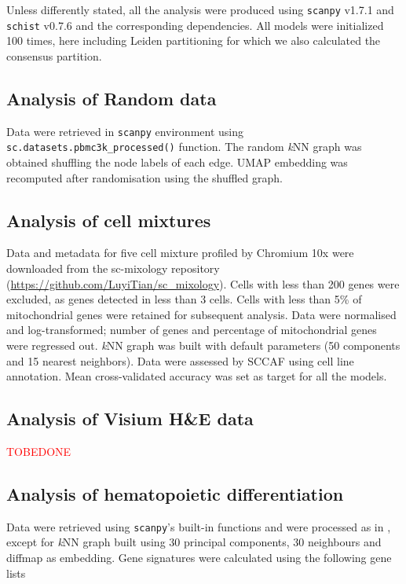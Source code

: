 \documentclass[10pt]{article}
\begin{document}
Unless differently stated, all the analysis were produced using \texttt{scanpy} v1.7.1 \cite{wolf_2018} and \texttt{schist} v0.7.6 and the corresponding dependencies. All models were initialized 100 times, here including Leiden partitioning for which we also calculated the consensus partition.

\subsection*{Analysis of Random data}

Data were retrieved in \texttt{scanpy} environment using \texttt{sc.datasets.pbmc3k\_processed()} function. The random \emph{k}NN graph was obtained shuffling the node labels of each edge. UMAP embedding was recomputed after randomisation using the shuffled graph.

\subsection*{Analysis of cell mixtures}

Data and metadata for five cell mixture profiled by Chromium 10x were downloaded from the sc-mixology repository (\href{https://github.com/LuyiTian/sc_mixology}{https:/\slash github.com\slash LuyiTian\slash sc\_mixology}). Cells with less than 200 genes were excluded, as genes detected in less than 3 cells. Cells with less than 5\% of mitochondrial genes were retained for subsequent analysis. Data were normalised and log-transformed; number of genes and percentage of mitochondrial genes were regressed out. \emph{k}NN graph was built with default parameters (50 components and 15 nearest neighbors). Data were assessed by SCCAF using cell line annotation. Mean cross-validated accuracy was set as target for all the models.

\subsection*{Analysis of Visium H\&E data}
\textcolor{red}{TOBEDONE}

\subsection*{Analysis of hematopoietic differentiation}

Data were retrieved using \texttt{scanpy}'s built-in functions and were processed as in \cite{wolf_2019}, except for \emph{k}NN graph built using 30 principal components, 30 neighbours and diffmap as embedding. Gene signatures were calculated using the following gene lists
\end{document}
